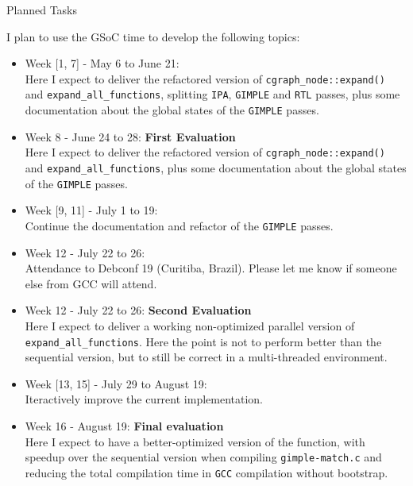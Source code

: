 \documentclass[12pt]{article}
\begin{document}
\begin{subsection}{Planned Tasks}

I plan to use the GSoC time to develop the following topics:

\begin{itemize}
 \item{Week [1, 7] - May 6 to June 21:} \\
Here I expect to deliver the refactored version
of \texttt{cgraph\_node::expand()} and \texttt{expand\_all\_functions},
splitting \texttt{IPA}, \texttt{GIMPLE} and \texttt{RTL} passes, plus
some documentation about the global states of the \texttt{GIMPLE}
passes.
 \item{Week 8 - June 24 to 28:} \textbf{First Evaluation} \\
Here I expect to deliver the refactored version of
\texttt{cgraph\_node::expand()} and \texttt{expand\_all\_functions},
plus some documentation about the global states of the \texttt{GIMPLE} passes.
 \item{Week [9, 11] - July 1 to 19:} \\
 Continue the documentation and refactor of the \texttt{GIMPLE} passes.
 \item{Week 12 - July 22 to 26:} \\
Attendance to Debconf 19 (Curitiba, Brazil). Please let me know
if someone else from GCC will attend.
 \item{Week 12 - July 22 to 26:} \textbf{Second Evaluation}\\
Here I expect to deliver a
working non-optimized parallel version of \texttt{expand\_all\_functions}.
Here the point is not to perform better than the sequential version,
but to still be correct in a multi-threaded environment.
\item{Week [13, 15] - July 29 to August 19:} \\
Iteractively improve the current implementation.
\item{Week 16 - August 19:} \textbf{Final evaluation}\\
Here I expect to have a
better-optimized version of the function, with speedup over the sequential
version when compiling \texttt{gimple-match.c} and reducing the total compilation time
in \texttt{GCC} compilation without bootstrap.

\end{itemize}


\end{subsection}
\end{document}
